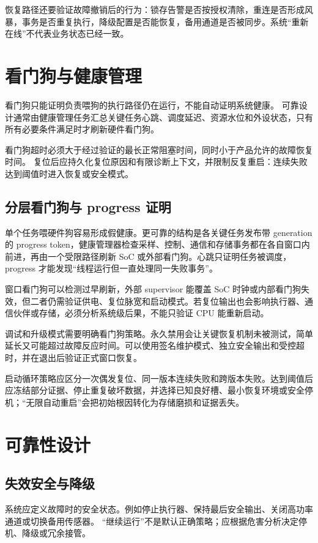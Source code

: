 恢复路径还要验证故障撤销后的行为：锁存告警是否按授权清除，重连是否形成风暴，事务是否重复执行，降级配置是否能恢复，备用通道是否被同步。系统“重新在线”不代表业务状态已经一致。

\section{看门狗与健康管理}

看门狗只能证明负责喂狗的执行路径仍在运行，不能自动证明系统健康。
可靠设计通常由健康管理任务汇总关键任务心跳、调度延迟、资源水位和外设状态，只有所有必要条件满足时才刷新硬件看门狗。

看门狗超时必须大于经过验证的最长正常阻塞时间，同时小于产品允许的故障恢复时间。
复位后应持久化复位原因和有限诊断上下文，并限制反复重启：连续失败达到阈值时进入恢复或安全模式。

\subsection{分层看门狗与 progress 证明}

单个任务喂硬件狗容易形成假健康。更可靠的结构是各关键任务发布带 generation 的 progress token，健康管理器检查采样、控制、通信和存储事务都在各自窗口内前进，再由一个受限路径刷新 SoC 或外部看门狗。心跳只证明任务被调度，progress 才能发现“线程运行但一直处理同一失败事务”。

窗口看门狗可以检测过早刷新，外部 supervisor 能覆盖 SoC 时钟或内部看门狗失效，但二者仍需验证供电、复位脉宽和启动模式。若复位输出也会影响执行器、通信伙伴或存储，必须分析系统级后果，不能只验证 CPU 能重新启动。

调试和升级模式需要明确看门狗策略。永久禁用会让关键恢复机制未被测试，简单延长又可能超过故障反应时间。可以使用签名维护模式、独立安全输出和受控超时，并在退出后验证正式窗口恢复。

启动循环策略应区分一次偶发复位、同一版本连续失败和跨版本失败。达到阈值后应冻结部分证据、停止重复破坏数据，并选择已知良好槽、最小恢复环境或安全停机；“无限自动重启”会把初始根因转化为存储磨损和证据丢失。

\section{可靠性设计}

\subsection{失效安全与降级}

系统应定义故障时的安全状态。例如停止执行器、保持最后安全输出、关闭高功率通道或切换备用传感器。
“继续运行”不是默认正确策略；应根据危害分析决定停机、降级或冗余接管。

